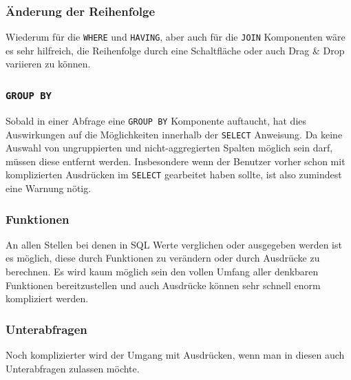 \documentclass[paper=a4,fontsize=11pt,parskip=half]{scrartcl}
\begin{document}
\subsubsection{Änderung der Reihenfolge}

Wiederum für die \texttt{WHERE} und \texttt{HAVING}, aber auch für die \texttt{JOIN} Komponenten wäre es sehr hilfreich, die Reihenfolge durch eine Schaltfläche oder auch Drag \& Drop variieren zu können.

\subsubsection{\texttt{GROUP BY}}

Sobald in einer Abfrage eine \texttt{GROUP BY} Komponente auftaucht, hat dies Auswirkungen auf die Möglichkeiten innerhalb der \texttt{SELECT} Anweisung. Da keine Auswahl von ungruppierten und nicht-aggregierten Spalten möglich sein darf, müssen diese entfernt werden. Insbesondere wenn der Benutzer vorher schon mit komplizierten Ausdrücken im \texttt{SELECT} gearbeitet haben sollte, ist also zumindest eine Warnung nötig.

\subsubsection{Funktionen}

An allen Stellen bei denen in SQL Werte verglichen oder ausgegeben werden ist es möglich, diese durch Funktionen zu verändern oder durch Ausdrücke zu berechnen. Es wird kaum möglich sein den vollen Umfang aller denkbaren Funktionen bereitzustellen und auch Ausdrücke können sehr schnell enorm kompliziert werden.


\subsubsection{Unterabfragen}

Noch komplizierter wird der Umgang mit Ausdrücken, wenn man in diesen auch Unterabfragen zulassen möchte.

\end{document}
